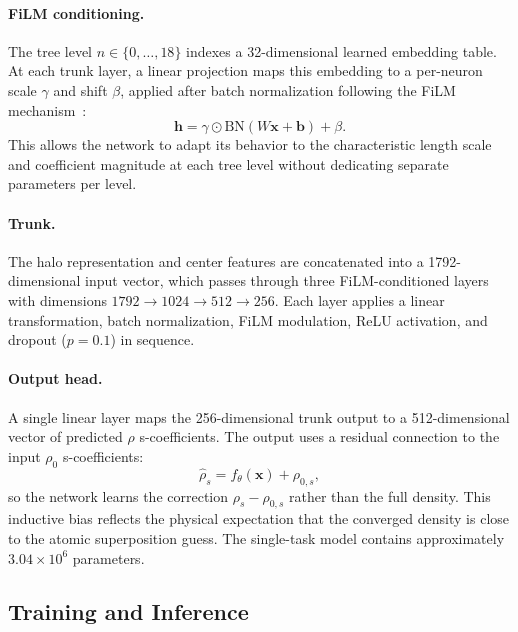 \paragraph{FiLM conditioning.}
The tree level $n \in \{0, \ldots, 18\}$ indexes a 32-dimensional learned embedding table. At each trunk layer, a linear projection maps this embedding to a per-neuron scale $\gamma$ and shift $\beta$, applied after batch normalization following the FiLM mechanism~\cite{perez2018film}:
\begin{equation}
  \mathbf{h} = \gamma \odot \mathrm{BN}(W\mathbf{x} + \mathbf{b}) + \beta.
\end{equation}
This allows the network to adapt its behavior to the characteristic length scale and coefficient magnitude at each tree level without dedicating separate parameters per level.

\paragraph{Trunk.}
The halo representation and center features are concatenated into a 1792-dimensional input vector, which passes through three FiLM-conditioned layers with dimensions $1792 \to 1024 \to 512 \to 256$. Each layer applies a linear transformation, batch normalization, FiLM modulation, ReLU activation, and dropout ($p = 0.1$) in sequence.

\paragraph{Output head.}
A single linear layer maps the 256-dimensional trunk output to a 512-dimensional vector of predicted $\rho$ s-coefficients. The output uses a residual connection to the input $\rho_0$ s-coefficients:
\begin{equation}
  \hat{\rho}_s = f_\theta(\mathbf{x}) + \rho_{0,s},
\end{equation}
so the network learns the correction $\rho_s - \rho_{0,s}$ rather than the full density. This inductive bias reflects the physical expectation that the converged density is close to the atomic superposition guess. The single-task model contains approximately $3.04 \times 10^6$ parameters.

\subsection{Training and Inference}\label{sec:training}

